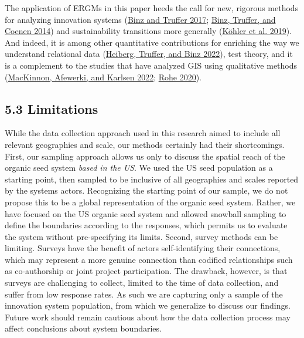 \documentclass[twoside,12pt,final]{ucthesis-CA2012}
\begin{document}
\begin{ucmainmatter}
The application of ERGMs in this paper heeds the call for new, rigorous
methods for analyzing innovation systems
(\protect\hyperlink{ref-Binz_Truffer_2017}{Binz and Truffer 2017}; \protect\hyperlink{ref-Binz_Truffer_Coenen_2014}{Binz, Truffer, and Coenen 2014})
and sustainability transitions more generally
(\protect\hyperlink{ref-Kuxf6hler_Geels_Kern_Markard_Onsongo_Wieczorek_Alkemade_Avelino_Bergek_Boons_et_al._2019}{Köhler et al. 2019}). And indeed, it
is among other quantitative contributions for enriching the way we
understand relational data
(\protect\hyperlink{ref-Heiberg_Truffer_Binz_2022}{Heiberg, Truffer, and Binz 2022}),
test theory, and it is a complement to the studies that have analyzed
GIS using qualitative methods
(\protect\hyperlink{ref-MacKinnon_Afewerki_Karlsen_2022}{MacKinnon, Afewerki, and Karlsen 2022}; \protect\hyperlink{ref-Rohe_2020}{Rohe 2020}).

\hypertarget{limitations}{%
\subsection{5.3 Limitations}\label{limitations}}

While the data collection approach used in this research aimed to
include all relevant geographies and scale, our methods certainly had
their shortcomings. First, our sampling approach allows us only to
discuss the spatial reach of the organic seed system \emph{based in the US}.
We used the US seed population as a starting point, then sampled to be
inclusive of all geographies and scales reported by the system\textquotesingle s
actors. Recognizing the starting point of our sample, we do not propose
this to be a global representation of the organic seed system. Rather,
we have focused on the US organic seed system and allowed snowball
sampling to define the boundaries according to the responses, which
permits us to evaluate the system without pre-specifying its limits.
Second, survey methods can be limiting. Surveys have the benefit of
actors self-identifying their connections, which may represent a more
genuine connection than codified relationships such as co-authorship or
joint project participation. The drawback, however, is that surveys are
challenging to collect, limited to the time of data collection, and
suffer from low response rates. As such we are capturing only a sample
of the innovation system population, from which we generalize to discuss
our findings. Future work should remain cautious about how the data
collection process may affect conclusions about system boundaries.


\end{ucmainmatter}
\end{document}

